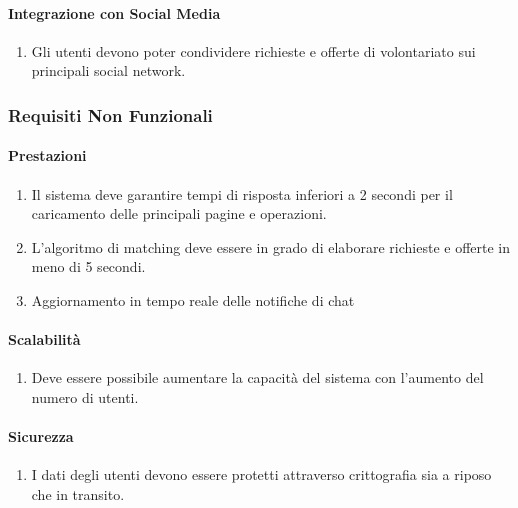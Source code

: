 \paragraph{Integrazione con Social Media}

\begin{enumerate}
    \item Gli utenti devono poter condividere richieste e offerte di volontariato sui principali social network.
\end{enumerate}

\subsubsection{Requisiti Non Funzionali}

\paragraph{Prestazioni}

\begin{enumerate}
    \item Il sistema deve garantire tempi di risposta inferiori a 2 secondi per il caricamento delle principali pagine e operazioni.
    \item L'algoritmo di matching deve essere in grado di elaborare richieste e offerte in meno di 5 secondi.
    \item Aggiornamento in tempo reale delle notifiche di chat
\end{enumerate}

\paragraph{Scalabilità}

\begin{enumerate}
    \item Deve essere possibile aumentare la capacità del sistema con l'aumento del numero di utenti.
\end{enumerate}

\paragraph{Sicurezza}

\begin{enumerate}
    \item I dati degli utenti devono essere protetti attraverso crittografia sia a riposo che in transito.
\end{enumerate}

